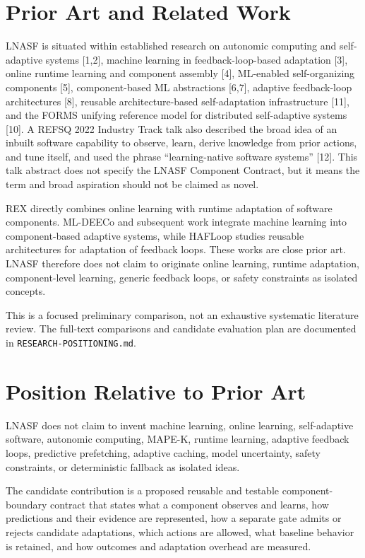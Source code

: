 \documentclass[11pt,a4paper]{article}
\begin{document}
\section{Prior Art and Related Work}
LNASF is situated within established research on autonomic computing and self-adaptive systems [1,2], machine learning in feedback-loop-based adaptation [3], online runtime learning and component assembly [4], ML-enabled self-organizing components [5], component-based ML abstractions [6,7], adaptive feedback-loop architectures [8], reusable architecture-based self-adaptation infrastructure [11], and the FORMS unifying reference model for distributed self-adaptive systems [10]. A REFSQ 2022 Industry Track talk also described the broad idea of an inbuilt software capability to observe, learn, derive knowledge from prior actions, and tune itself, and used the phrase ``learning-native software systems'' [12]. This talk abstract does not specify the LNASF Component Contract, but it means the term and broad aspiration should not be claimed as novel.

REX directly combines online learning with runtime adaptation of software components. ML-DEECo and subsequent work integrate machine learning into component-based adaptive systems, while HAFLoop studies reusable architectures for adaptation of feedback loops. These works are close prior art. LNASF therefore does not claim to originate online learning, runtime adaptation, component-level learning, generic feedback loops, or safety constraints as isolated concepts.

This is a focused preliminary comparison, not an exhaustive systematic literature review. The full-text comparisons and candidate evaluation plan are documented in \texttt{RESEARCH-POSITIONING.md}.

\section{Position Relative to Prior Art}
LNASF does not claim to invent machine learning, online learning, self-adaptive software, autonomic computing, MAPE-K, runtime learning, adaptive feedback loops, predictive prefetching, adaptive caching, model uncertainty, safety constraints, or deterministic fallback as isolated ideas.

The candidate contribution is a proposed reusable and testable component-boundary contract that states what a component observes and learns, how predictions and their evidence are represented, how a separate gate admits or rejects candidate adaptations, which actions are allowed, what baseline behavior is retained, and how outcomes and adaptation overhead are measured.
\end{document}
